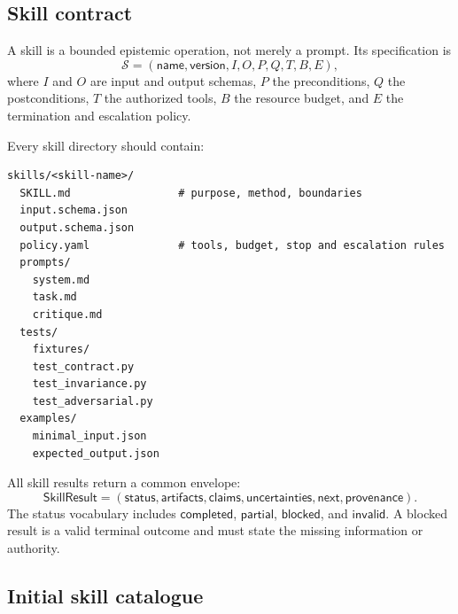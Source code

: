 \documentclass[11pt]{article}
\begin{document}
\subsection{Skill contract}

A skill is a bounded epistemic operation, not merely a prompt. Its specification is
\begin{equation}
\mathcal{S}=
(\mathsf{name},\mathsf{version},I,O,P,Q,T,B,E),
\end{equation}
where $I$ and $O$ are input and output schemas, $P$ the preconditions, $Q$ the postconditions, $T$
the authorized tools, $B$ the resource budget, and $E$ the termination and escalation policy.

Every skill directory should contain:
\begin{lstlisting}[style=spec,caption={Required skill directory contract.}]
skills/<skill-name>/
  SKILL.md                 # purpose, method, boundaries
  input.schema.json
  output.schema.json
  policy.yaml              # tools, budget, stop and escalation rules
  prompts/
    system.md
    task.md
    critique.md
  tests/
    fixtures/
    test_contract.py
    test_invariance.py
    test_adversarial.py
  examples/
    minimal_input.json
    expected_output.json
\end{lstlisting}

All skill results return a common envelope:
\begin{equation}
\mathsf{SkillResult}=
(\mathsf{status},\mathsf{artifacts},\mathsf{claims},
\mathsf{uncertainties},\mathsf{next},\mathsf{provenance}).
\end{equation}
The status vocabulary includes \(\mathsf{completed}\), \(\mathsf{partial}\),
\(\mathsf{blocked}\), and \(\mathsf{invalid}\). A blocked result is a valid terminal outcome and must
state the missing information or authority.

\subsection{Initial skill catalogue}
\end{document}
